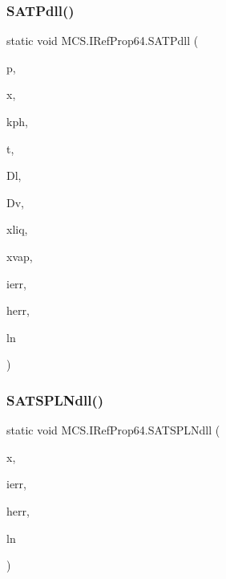 \subsubsection{\texorpdfstring{S\+A\+T\+Pdll()}{SATPdll()}}
{\footnotesize\ttfamily static void M\+C\+S.\+I\+Ref\+Prop64.\+S\+A\+T\+Pdll (\begin{DoxyParamCaption}\item[{ref double}]{p,  }\item[{\mbox{[}\+Marshal\+As(\+Unmanaged\+Type.\+L\+P\+Array, Size\+Param\+Index=0)\mbox{]} double \mbox{[}$\,$\mbox{]}}]{x,  }\item[{ref long}]{kph,  }\item[{ref double}]{t,  }\item[{ref double}]{Dl,  }\item[{ref double}]{Dv,  }\item[{\mbox{[}\+Marshal\+As(\+Unmanaged\+Type.\+L\+P\+Array, Size\+Param\+Index=0)\mbox{]} double \mbox{[}$\,$\mbox{]}}]{xliq,  }\item[{\mbox{[}\+Marshal\+As(\+Unmanaged\+Type.\+L\+P\+Array, Size\+Param\+Index=0)\mbox{]} double \mbox{[}$\,$\mbox{]}}]{xvap,  }\item[{ref long}]{ierr,  }\item[{\mbox{[}\+Marshal\+As(\+Unmanaged\+Type.\+V\+B\+By\+Ref\+Str)\mbox{]} ref string}]{herr,  }\item[{ref long}]{ln }\end{DoxyParamCaption})}

\hypertarget{class_m_c_s_1_1_i_ref_prop64_ae19526af9a48fb45c36f6363cfd98138}{}\label{class_m_c_s_1_1_i_ref_prop64_ae19526af9a48fb45c36f6363cfd98138} 
\subsubsection{\texorpdfstring{S\+A\+T\+S\+P\+L\+Ndll()}{SATSPLNdll()}}
{\footnotesize\ttfamily static void M\+C\+S.\+I\+Ref\+Prop64.\+S\+A\+T\+S\+P\+L\+Ndll (\begin{DoxyParamCaption}\item[{\mbox{[}\+Marshal\+As(\+Unmanaged\+Type.\+L\+P\+Array, Size\+Param\+Index=0)\mbox{]} double \mbox{[}$\,$\mbox{]}}]{x,  }\item[{ref long}]{ierr,  }\item[{\mbox{[}\+Marshal\+As(\+Unmanaged\+Type.\+V\+B\+By\+Ref\+Str)\mbox{]} ref string}]{herr,  }\item[{ref long}]{ln }\end{DoxyParamCaption})}

